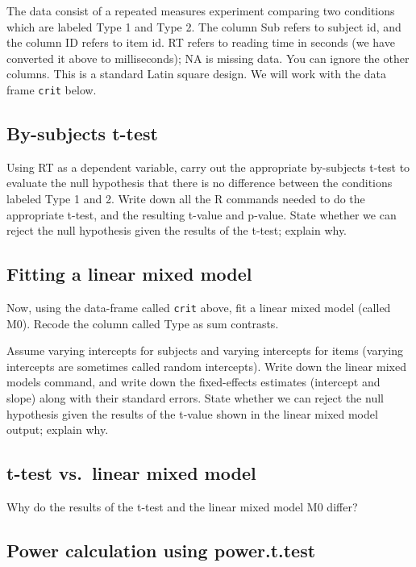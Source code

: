 \documentclass[12pt,]{krantz}
\begin{document}
The data consist of a repeated measures experiment comparing two conditions which are labeled Type 1 and Type 2. The column Sub refers to subject id, and the column ID refers to item id. RT refers to reading time in seconds (we have converted it above to milliseconds); NA is missing data. You can ignore the other columns. This is a standard Latin square design. We will work with the data frame \texttt{crit} below.

\hypertarget{sec:LMExercisesPart1}{%
\subsection{By-subjects t-test}\label{sec:LMExercisesPart1}}

Using RT as a dependent variable, carry out the appropriate by-subjects t-test to evaluate the null hypothesis that there is no difference between the conditions labeled Type 1 and 2. Write down all the R commands needed to do the appropriate t-test, and the resulting t-value and p-value. State whether we can reject the null hypothesis given the results of the t-test; explain why.

\hypertarget{sec:LMExercisesPart2}{%
\subsection{Fitting a linear mixed model}\label{sec:LMExercisesPart2}}

Now, using the data-frame called \texttt{crit} above, fit a linear mixed model (called M0). Recode the column called Type as sum contrasts.

Assume varying intercepts for subjects and varying intercepts for items (varying intercepts are sometimes called random intercepts). Write down the linear mixed models command, and write down the fixed-effects estimates (intercept and slope) along with their standard errors. State whether we can reject the null hypothesis given the results of the t-value shown in the linear mixed model output; explain why.

\hypertarget{sec:LMExercisesPart3}{%
\subsection{t-test vs.~linear mixed model}\label{sec:LMExercisesPart3}}

Why do the results of the t-test and the linear mixed model M0 differ?

\hypertarget{sec:LMExercisesPart4}{%
\subsection{Power calculation using power.t.test}\label{sec:LMExercisesPart4}}
\end{document}
